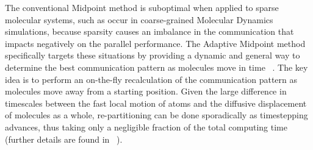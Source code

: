 \documentclass[paper=a4, fontsize=11pt,bibtotoc]{scrartcl}		%
\begin{document}
The conventional Midpoint method is suboptimal when applied to sparse molecular systems, such as occur in coarse-grained 
Molecular Dynamics simulations, because sparsity causes an imbalance in the communication that impacts negatively on the parallel performance. 
The Adaptive Midpoint method specifically targets these situations by providing a dynamic and general way to determine the best communication 
pattern as molecules move in time ~\cite{FSSM17}.
The key idea is to perform an on-the-fly recalculation of the communication pattern as molecules move away from a starting position. 
Given the large difference in timescales between the fast local motion of atoms and the diffusive displacement of molecules as a whole, 
re-partitioning can be done sporadically as timestepping advances, thus taking only a negligible fraction of the total 
computing time (further details are found in ~\cite{FSSM17}).
\end{document}
